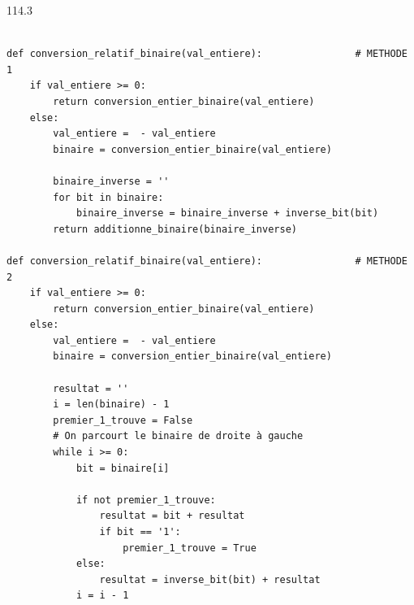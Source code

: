 \documentclass[a4paper,10pt]{report}
\begin{document}
  
    \begin{answer}{1}{14.3}
    \begin{verbatim}

def conversion_relatif_binaire(val_entiere):                # METHODE 1
    if val_entiere >= 0:
        return conversion_entier_binaire(val_entiere)
    else:
        val_entiere =  - val_entiere
        binaire = conversion_entier_binaire(val_entiere)

        binaire_inverse = ''
        for bit in binaire:
            binaire_inverse = binaire_inverse + inverse_bit(bit)
        return additionne_binaire(binaire_inverse)

def conversion_relatif_binaire(val_entiere):                # METHODE 2
    if val_entiere >= 0:
        return conversion_entier_binaire(val_entiere)
    else:
        val_entiere =  - val_entiere
        binaire = conversion_entier_binaire(val_entiere)

        resultat = ''
        i = len(binaire) - 1
        premier_1_trouve = False
        # On parcourt le binaire de droite à gauche
        while i >= 0:
            bit = binaire[i]
            
            if not premier_1_trouve:
                resultat = bit + resultat
                if bit == '1':
                    premier_1_trouve = True
            else:
                resultat = inverse_bit(bit) + resultat
            i = i - 1
    
    \end{verbatim}
    \end{answer}
\end{document}
